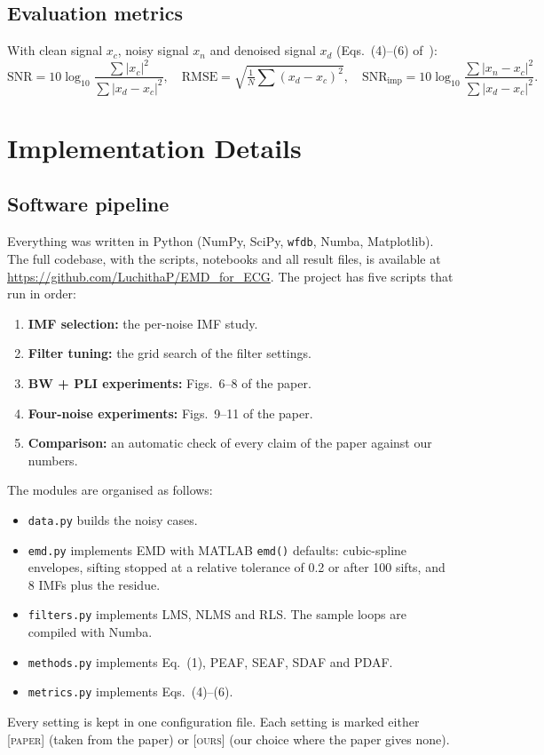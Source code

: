 \documentclass[11pt,a4paper]{article}
\newcommand{\snrimp}{\mathrm{SNR}_\mathrm{imp}}
\begin{document}
\subsection{Evaluation metrics}
With clean signal $x_c$, noisy signal $x_n$ and denoised signal $x_d$ (Eqs.~(4)--(6) of~\cite{dai}):
\begin{equation}
  \mathrm{SNR}=10\log_{10}\frac{\sum|x_c|^2}{\sum|x_d-x_c|^2},\quad
  \mathrm{RMSE}=\sqrt{\tfrac{1}{N}\textstyle\sum(x_d-x_c)^2},\quad
  \snrimp=10\log_{10}\frac{\sum|x_n-x_c|^2}{\sum|x_d-x_c|^2}.
\end{equation}

\section{Implementation Details}

\subsection{Software pipeline}
Everything was written in Python (NumPy, SciPy, \texttt{wfdb}, Numba, Matplotlib). The full codebase, with the
scripts, notebooks and all result files, is available at \url{https://github.com/LuchithaP/EMD_for_ECG}. The
project has five scripts that run in order:
\begin{enumerate}
  \item \textbf{IMF selection:} the per-noise IMF study.
  \item \textbf{Filter tuning:} the grid search of the filter settings.
  \item \textbf{BW + PLI experiments:} Figs.~6--8 of the paper.
  \item \textbf{Four-noise experiments:} Figs.~9--11 of the paper.
  \item \textbf{Comparison:} an automatic check of every claim of the paper against our numbers.
\end{enumerate}
The modules are organised as follows:
\begin{itemize}
  \item \texttt{data.py} builds the noisy cases.
  \item \texttt{emd.py} implements EMD with MATLAB \texttt{emd()} defaults: cubic-spline envelopes, sifting stopped
        at a relative tolerance of 0.2 or after 100 sifts, and 8 IMFs plus the residue.
  \item \texttt{filters.py} implements LMS, NLMS and RLS. The sample loops are compiled with Numba.
  \item \texttt{methods.py} implements Eq.~(1), PEAF, SEAF, SDAF and PDAF.
  \item \texttt{metrics.py} implements Eqs.~(4)--(6).
\end{itemize}
Every setting is kept in one configuration file. Each setting is marked either \textsc{[paper]} (taken from the paper)
or \textsc{[ours]} (our choice where the paper gives none).
\end{document}
